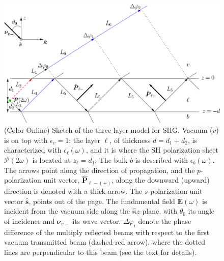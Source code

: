 \documentclass[10pt]{book}
\begin{document}
\begin{figure}[t]
\centering
\includegraphics[scale=.5]{../figures/multi}
\caption{(Color Online) Sketch of the three layer model for SHG. Vacuum ($v$) is
on top with $\epsilon_v=1$; the layer $\ell$, of thickness $d=d_1+d_2$, is
characterized with $\epsilon_{\ell}(\omega)$, and it is where the SH
polarization sheet $\boldsymbol{\mathcal{P}}(2\omega)$ is located at
$z_\ell=d_1$; The bulk $b$ is described with $\epsilon_{b}(\omega)$. The arrows
point along the direction of propagation, and the $p$-polarization unit vector,
$\hat{\mathbf{P}}_{\ell -(+)}$, along the downward (upward) direction is denoted
with a thick arrow. The $s$-polarization unit vector $\hat{\mathbf{s}}$, points
out of the page. The fundamental field $\mathbf{E}(\omega)$ is incident from the
vacuum side along the $\hat{\boldsymbol{\kappa}}z$-plane, with $\theta_0$ its
angle of incidence and $\boldsymbol{\nu}_{v-}$ its wave vector.
$\Delta\varphi_i$ denote the phase difference of the multiply reflected beams
with respect to the first vacuum transmitted beam (dashed-red arrow), where the
dotted lines are perpendicular to this beam (see the text for details).}
\label{3layer}
\end{figure}
\end{document}
